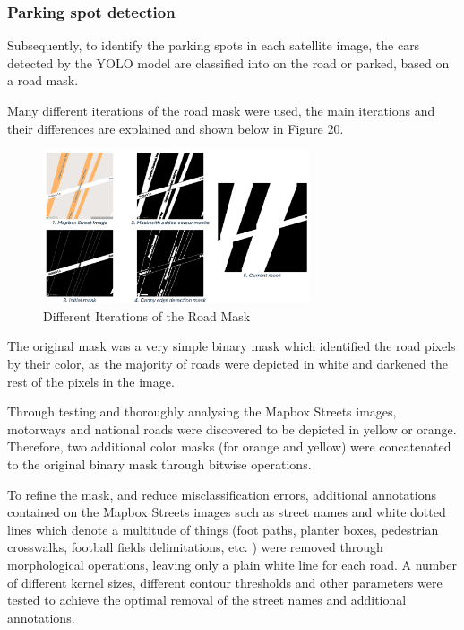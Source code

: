 \newpage{}
\subsubsection{Parking spot detection}
Subsequently, to identify the parking spots in each satellite image, the cars
detected by the YOLO model are classified into on the road or parked, based on a
road mask.

Many different iterations of the road mask were used, the main iterations and
their differences are explained and shown below in Figure 20.

\begin{figure}[htbp]
  \centering{}
  \includegraphics[width=0.7\textwidth]{images/road-mask-iteration.png}
  \caption{Different Iterations of the Road Mask}
  \label{fig:mask_iterations}
\end{figure}

The original mask was a very simple binary mask which identified the road pixels
by their color, as the majority of roads were depicted in white and darkened the
rest of the pixels in the image.

Through testing and thoroughly analysing the Mapbox Streets images, motorways
and national roads were discovered to be depicted in yellow or orange.
Therefore, two additional color masks (for orange and yellow) were concatenated
to the original binary mask through bitwise operations.

To refine the mask, and reduce misclassification errors, additional annotations
contained on the Mapbox Streets images such as street names and white dotted
lines which denote a multitude of things (foot paths, planter boxes, pedestrian
crosswalks, football fields delimitations, etc. ) were removed through
morphological operations, leaving only a plain white line for each road. A
number of different kernel sizes, different contour thresholds and other
parameters were tested to achieve the optimal removal of the street names and
additional annotations.


